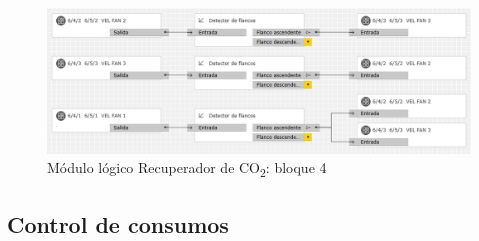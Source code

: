 \begin{figure}[H]
\centering
\includegraphics[width=1.05\textwidth]{figures/log_co2_b4.png}   
\caption{Módulo lógico Recuperador de CO\textsubscript{2}: bloque 4}
\label{fig:log_co2_b4}
\end{figure}


\subsection{Control de consumos}


